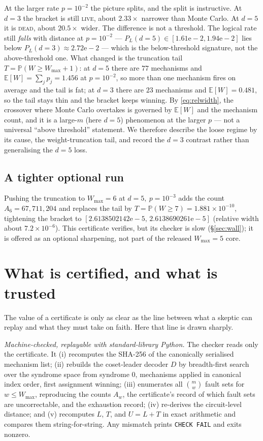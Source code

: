 \documentclass[11pt]{amsart}
\newcommand{\PL}{P_{L}}
\newcommand{\WMAX}{W_{\max}}
\newcommand{\Prb}{\mathbb{P}}
\newcommand{\Ex}{\mathbb{E}}
\theoremstyle{plain}
\theoremstyle{definition}
\theoremstyle{remark}
\begin{document}
At the larger rate $p=10^{-2}$ the picture splits, and the split is instructive.
At $d=3$ the bracket is still \textsc{live}, about $2.33\times$ narrower than
Monte Carlo. At $d=5$ it is \textsc{dead}, about $20.5\times$ wider. The
difference is not a threshold. The logical rate still \emph{falls} with
distance at $p=10^{-2}$ --- $\PL(d{=}5)\in[1.61\text{e}{-}2,1.94\text{e}{-}2]$
lies below $\PL(d{=}3)\approx 2.72\text{e}{-}2$ --- which is the below-threshold
signature, not the above-threshold one. What changed is the truncation tail
$T=\Prb(W\ge\WMAX+1)$: at $d=5$ there are $77$ mechanisms and
$\Ex[W]=\sum_j p_j=1.456$ at $p=10^{-2}$, so more than one mechanism fires on
average and the tail is fat; at $d=3$ there are $23$ mechanisms and
$\Ex[W]=0.481$, so the tail stays thin and the bracket keeps winning. By
\eqref{eq:relwidth}, the crossover where Monte Carlo overtakes is governed by
$\Ex[W]$ and the mechanism count, and it is a large-$m$ (here $d=5$) phenomenon
at the larger $p$ --- not a universal ``above threshold'' statement. We
therefore describe the loose regime by its cause, the weight-truncation tail,
and record the $d=3$ contrast rather than generalising the $d=5$ loss.

\subsection{A tighter optional run} Pushing the truncation to $\WMAX=6$ at
$d=5,\ p=10^{-3}$ adds the count $A_6=67{,}711{,}204$ and replaces the tail by
$T=\Prb(W\ge7)=1.881\times10^{-10}$, tightening the bracket to
$[2.6138502142\text{e}{-}5,\,2.6138690261\text{e}{-}5]$ (relative width about
$7.2\times10^{-6}$). This certificate verifies, but its checker is slow
(\S\ref{sec:wall}); it is offered as an optional sharpening, not part of the
released $\WMAX=5$ core.

\section{What is certified, and what is trusted}\label{sec:trust}

The value of a certificate is only as clear as the line between what a skeptic
can replay and what they must take on faith. Here that line is drawn sharply.

\emph{Machine-checked, replayable with standard-library Python.} The checker
reads only the certificate. It (i) recomputes the SHA-256 of the canonically
serialised mechanism list; (ii) rebuilds the coset-leader decoder $D$ by
breadth-first search over the syndrome space from syndrome $0$, mechanisms
applied in canonical index order, first assignment winning; (iii) enumerates
all $\binom{m}{w}$ fault sets for $w\le\WMAX$, reproducing the counts $A_w$,
the certificate's record of which fault sets are uncorrectable, and the
exhaustion record; (iv) re-derives the circuit-level distance; and (v)
recomputes $L$, $T$, and $U=L+T$ in exact arithmetic and compares them
string-for-string. Any mismatch prints \texttt{CHECK FAIL} and exits nonzero.
\end{document}
